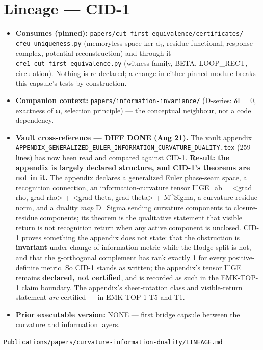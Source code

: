 \hypertarget{lineage-cid-1}{%
\chapter{Lineage --- CID-1}\label{lineage-cid-1}}

\begin{itemize}
\tightlist
\item
  \textbf{Consumes (pinned):} \texttt{papers/cut-first-equivalence/certificates/}
  \texttt{cfeu\_uniqueness.py} (memoryless space ker d₁, residue functional,
  response complex, potential reconstruction) and through it
  \texttt{cfe1\_cut\_first\_equivalence.py} (witness family, BETA, LOOP\_RECT,
  circulation). Nothing is re-declared; a change in either pinned
  module breaks this capsule's tests by construction.
\item
  \textbf{Companion context:} \texttt{papers/information-invariance/} (D-series:
  δI = 0, exactness of ω, selection principle) --- the conceptual
  neighbour, not a code dependency.
\item
  \textbf{Vault cross-reference --- DIFF DONE (Aug 21).} The vault appendix
  \texttt{APPENDIX\_GENERALIZED\_EULER\_INFORMATION\_CURVATURE\_DUALITY.tex} (259
  lines) has now been read and compared against CID-1. \textbf{Result: the
  appendix is largely declared structure, and CID-1's theorems are not
  in it.} The appendix declares a generalized Euler phase-seam space,
  a recognition connection, an information-curvature tensor
  I\^{}GE\_ab = \textless grad rho, grad rho\textgreater{} + \textless grad theta, grad theta\textgreater{} + M\^{}Sigma,
  a curvature-residue norm, and a duality \emph{map} D\_Sigma sending
  curvature components to closure-residue components; its theorem is
  the qualitative statement that visible return is not recognition
  return when any active component is unclosed. CID-1 proves something
  the appendix does not state: that the obstruction is \textbf{invariant}
  under change of information metric while the Hodge split is not, and
  that the g-orthogonal complement has rank exactly 1 for every
  positive-definite metric. So CID-1 stands as written; the appendix's
  tensor I\^{}GE remains \textbf{declared, not certified}, and is recorded as
  such in the EMK-TOP-1 claim boundary. The appendix's sheet-rotation
  class and visible-return statement \emph{are} certified --- in EMK-TOP-1
  T5 and T1.
\item
  \textbf{Prior executable version:} NONE --- first bridge capsule between
  the curvature and information layers.
\end{itemize}

\begin{flushright}\small\texttt{Publications/papers/curvature-information-duality/LINEAGE.md}\end{flushright}
